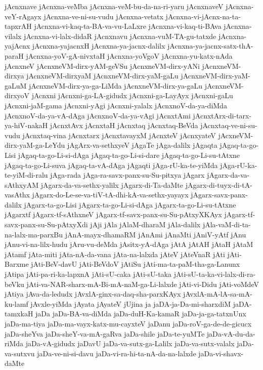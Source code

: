 {jAcnxnave
jAcnxna-veMba
jAcnxna-veM-bu-da-na-ri-yaru
jAcnxnaveV
jAcnxna-veY-rAgayx
jAcnxna-ve-ni-su-vudu
jAcnxna-vetatx
jAcnxna-vi-jAcnx-na-ta-tapxrAH
jAcnxna-vi-kaq-ta-BA-va-vu-LaLxre
jAcnxna-vi-kaq-ti-BAva
jAcnxna-vilalx
jAcnxna-vi-lalx-didaR
jAcnxnavu
jAcnxna-vuM-TA-gu-tatxde
jAcnxna-yajAcnx
jAcnxna-yajacnxH
jAcnxna-ya-jacnx-dalilx
jAcnxna-ya-jacnx-satx-thA-paraH
jAcnxna-yoV-gA-nivxtaH
jAcnxna-yoVgoV
jAcnxna-yu-katx-nAda
jAcnxneV
jAcnxneVM-dirx-yAM-geVSu
jAcnxneVM-dirx-yANi
jAcnxneVM-dirxya
jAcnxneVM-dirxyaM
jAcnxneVM-dirx-yaM-gaLu
jAcnxneVM-dirx-yaM-gaLuM
jAcnxneVM-dirx-ya-ga-LiMda
jAcnxneVM-dirx-ya-gaLu
jAcnxneVM-dirxyoV
jAcnxni
jAcnxni-ga-LA-gidudx
jAcnxni-ga-LayAyx
jAcnxni-gaLu
jAcnxni-jaM-gama
jAcnxni-yAgi
jAcnxni-yalalx
jAcnxnoV-da-ya-diMda
jAcnxnoV-da-ya-vA-dAga
jAcnxnoV-da-ya-vAgi
jAcnxtAmi
jAcnxtArx-di-tarx-ya-hiV-nakaH
jAcnxtAvx
jAcnxtaH
jAcnxtaq
jAcnxtaq-BeVda
jAcnxtaq-ve-ni-su-vudu
jAcnxtaq-vina
jAcnxtarx
jAcnxtavayxM
jAcnxteV
jAcnxyateV
jAcxneVM-dirx-yaM-ga-LeYdu
jAgArx-va-sethxyeV
jAgaTe
jAga-dalilx
jAgaqta
jAgaq-ta-go-Lisi
jAgaq-ta-go-Li-si-dAga
jAgaq-ta-go-Li-si-dare
jAgaq-ta-go-Li-su-tAtxne
jAgaq-ta-go-Li-suva
jAgaq-ta-vA-dAga
jAgaqti
jAga-rU-ka-te-yiMda
jAga-rU-ka-te-yiM-di-ralu
jAga-rada
jAga-ra-savx-panx-su-Su-pitxya
jAgarx
jAgarx-da-va-sAthxyAM
jAgarx-da-va-sethx-yalilx
jAgarx-di-Ta-daMte
jAgarx-di-tuyx-di-tA-vasAthx
jAgarx-do-Le-se-va-tiV-tA-dhi-kA-va-sethx-yayayx
jAgarx-savx-panx-dalilx
jAgarx-ta-go-Lisi
jAgarx-ta-go-Li-si-dAga
jAgarx-ta-go-Li-su-tAtxne
jAgarxtf
jAgarx-tf-sAthxneV
jAgarx-tf-savx-panx-su-Su-pAtxyXKAyx
jAgarx-tf-savx-panx-su-Su-pAtxyXdi
jAji
jAla
jAlaM-dharaM
jAla-dalilx
jAla-vaM-di-ta-na-lalx-ma-parxBu
jAnA-mayx-dhamaRM
jAnAmi
jAnaMti
jAniV-yAtf
jAnu
jAnu-vi-na-lilx-hudu
jAru-vu-deMda
jAsitx-yA-dAga
jAtA
jAtAH
jAtaH
jAtaM
jAtamf
jAta-miti
jAta-nA-da-vana
jAta-na-lalxda
jAteV
jAteVnaR
jAti
jAti-Barxme
jAti-BeV-davU
jAti-BeVdoV
jAtiSu
jAti-ma-ta-paM-tha-ga-Lanunx
jAtipa
jAti-pa-ri-ka-lapxnA
jAti-sU-caka
jAti-sU-taka
jAti-sU-ta-ka-vi-lalx-di-ra-beVku
jAti-va-NAR-sharx-mA-Bi-mA-naM-ga-Li-lalxde
jAti-vi-Didu
jAti-voMdeV
jAtiya
jAva-da-ledudx
jAvxlA-ginx-sa-daq-sha-parxKAyx
jAvxlA-mA-lA-sa-mA-ku-lamf
jAvxle-yiMda
jAyata
jAyateV
jUjina
ja
jaDA-ja-Da-mi-sharxdiM
jaDA-tamxkaH
jaDa
jaDa-BA-va-diMda
jaDa-duH-Ka-kamaR
jaDa-ja-ga-tatxnUnx
jaDa-ma-tiya
jaDa-ma-vayx-katx-mu-cayxteV
jaDanu
jaDa-roV-ga-de-de-gicucx
jaDa-sheYva
jaDa-sheY-va-mA-gaRva
jaDa-shile
jaDa-te-yuMTe
jaDa-vA-du-da-riMda
jaDa-vA-gidudx
jaDavU
jaDa-va-sutx-ga-Lalilx
jaDa-va-sutx-valalx
jaDa-va-sutxvu
jaDa-ve-ni-si-davu
jaDa-vi-ra-hi-ta-nA-da-na-lalxde
jaDa-vi-shavx-daMte
}
